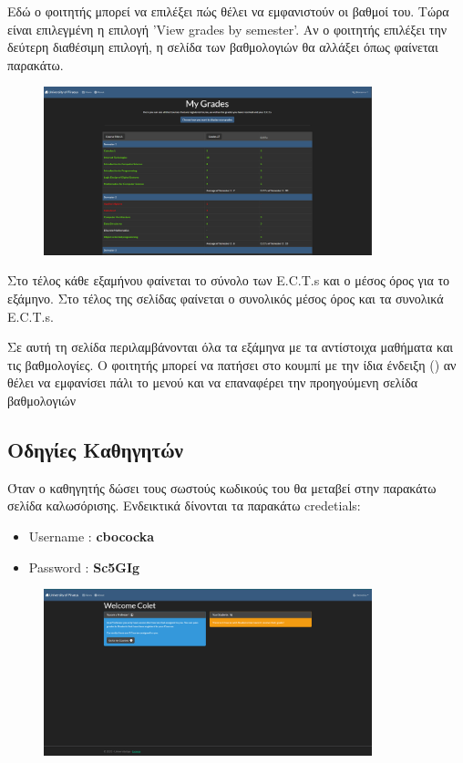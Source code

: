 \documentclass[12pt]{article}
\begin{document}
	Εδώ ο φοιτητής μπορεί να επιλέξει πώς θέλει να εμφανιστούν οι βαθμοί του. Τώρα είναι επιλεγμένη η επιλογή 'View grades by semester'. Αν ο φοιτητής επιλέξει την δεύτερη διαθέσιμη επιλογή, η σελίδα των βαθμολογιών θα αλλάξει όπως φαίνεται παρακάτω.
	
	\begin{figure}[H]
	\centering
	\includegraphics[width=0.85\textwidth]{allgrades.png}
	\caption{}
	\label{fig:emptyView}
	\end{figure}

	Στο τέλος κάθε εξαμήνου φαίνεται το σύνολο των E.C.T.s και ο μέσος όρος για το εξάμηνο. Στο τέλος της σελίδας φαίνεται ο συνολικός μέσος όρος και τα συνολικά E.C.T.s.
	
	Σε αυτή τη σελίδα περιλαμβάνονται όλα τα εξάμηνα με τα αντίστοιχα μαθήματα και τις βαθμολογίες. Ο φοιτητής μπορεί να πατήσει στο κουμπί με την ίδια ένδειξη () αν θέλει να εμφανίσει πάλι το μενού και να επαναφέρει την προηγούμενη σελίδα βαθμολογιών
		

	\newpage
	\subsection{Οδηγίες Καθηγητών}
	
	Όταν ο καθηγητής δώσει τους σωστούς κωδικούς του θα μεταβεί στην παρακάτω σελίδα καλωσόρισης. Ενδεικτικά δίνονται τα παρακάτω credetials:
	
	\begin{itemize}
		\item Username : \textbf{cbococka}
		\item Password : \textbf{Sc5GIg}
	\end{itemize}

	\begin{figure}[H]
	\centering
	\includegraphics[width=0.85\textwidth]{wellprof.png}
	\caption{}
	\label{fig:emptyView}
	\end{figure}
\end{document}
